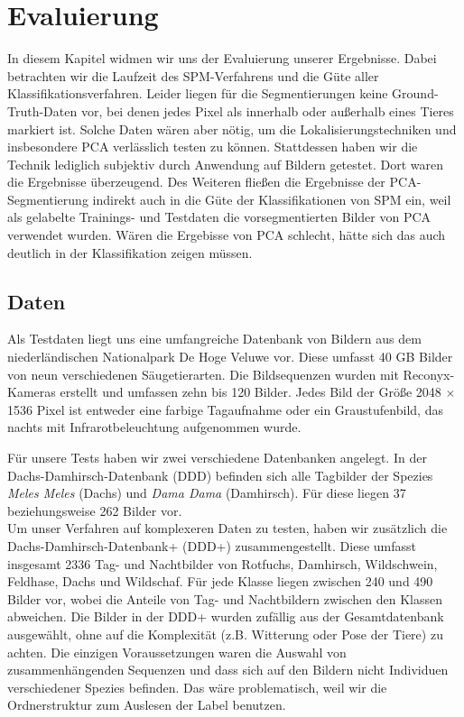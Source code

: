 \section{Evaluierung}
\label{sec:eval}

In diesem Kapitel widmen wir uns der Evaluierung unserer Ergebnisse. Dabei betrachten wir die Laufzeit des SPM-Verfahrens und die Güte aller Klassifikationsverfahren. Leider liegen für die Segmentierungen keine Ground-Truth-Daten vor, bei denen jedes Pixel als innerhalb oder außerhalb eines Tieres markiert ist. Solche Daten wären aber nötig, um die Lokalisierungstechniken und insbesondere PCA verlässlich testen zu können. Stattdessen haben wir die Technik lediglich subjektiv durch Anwendung auf Bildern getestet. Dort waren die Ergebnisse überzeugend. Des Weiteren fließen die Ergebnisse der PCA-Segmentierung indirekt auch in die Güte der Klassifikationen von SPM ein, weil als gelabelte Trainings- und Testdaten die vorsegmentierten Bilder von PCA verwendet wurden. Wären die Ergebisse von PCA schlecht, hätte sich das auch deutlich in der Klassifikation zeigen müssen.

\subsection{Daten}

Als Testdaten liegt uns eine umfangreiche Datenbank von Bildern aus dem niederländischen Nationalpark De Hoge Veluwe vor. Diese umfasst 40 GB Bilder von neun verschiedenen Säugetierarten. Die Bildsequenzen wurden mit Reconyx-Kameras erstellt und umfassen zehn bis 120 Bilder. Jedes Bild der Größe 2048 $\times$ 1536 Pixel ist entweder eine farbige Tagaufnahme oder ein Graustufenbild, das nachts mit Infrarotbeleuchtung aufgenommen wurde.

Für unsere Tests haben wir zwei verschiedene Datenbanken angelegt. In der Dachs-Damhirsch-Datenbank (DDD) befinden sich alle Tagbilder der Spezies \emph{Meles Meles} (Dachs) und \emph{Dama Dama} (Damhirsch). Für diese liegen 37 beziehungsweise 262 Bilder vor. \\
Um unser Verfahren auf komplexeren Daten zu testen, haben wir zusätzlich die Dachs-Damhirsch-Datenbank+ (DDD+) zusammengestellt. Diese umfasst insgesamt 2336 Tag- und Nachtbilder von Rotfuchs, Damhirsch, Wildschwein, Feldhase, Dachs und Wildschaf. Für jede Klasse liegen zwischen 240 und 490 Bilder vor, wobei die Anteile von Tag- und Nachtbildern zwischen den Klassen abweichen. Die Bilder in der DDD+ wurden zufällig aus der Gesamtdatenbank ausgewählt, ohne auf die Komplexität (z.B. Witterung oder Pose der Tiere) zu achten. Die einzigen Voraussetzungen waren die Auswahl von zusammenhängenden Sequenzen und dass sich auf den Bildern nicht Individuen verschiedener Spezies befinden. Das wäre problematisch, weil wir die Ordnerstruktur zum Auslesen der Label benutzen.

